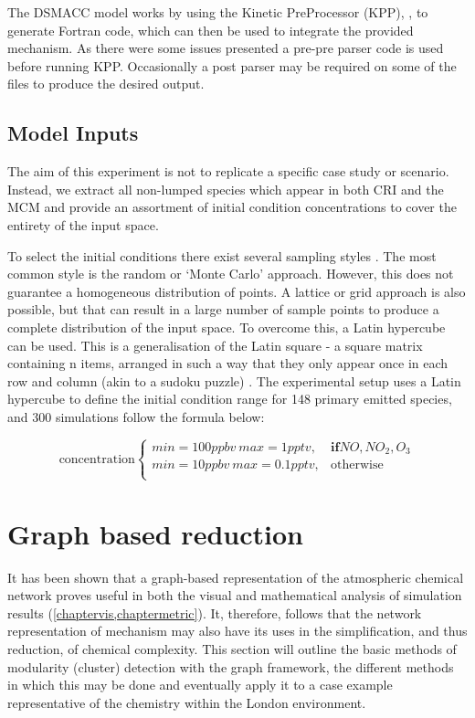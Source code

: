 The DSMACC model works by using the Kinetic PreProcessor (KPP), \citep{kpp}, to generate Fortran code, which can then be used to integrate the provided mechanism. As there were some issues presented a pre-pre parser code is used before running KPP. Occasionally a post parser may be required on some of the files to produce the desired output.

\subsection{Model Inputs}\label{sec:lumpinputs}
The aim of this experiment is not to replicate a specific case study or scenario. Instead, we extract all non-lumped species which appear in both CRI and the MCM and provide an assortment of initial condition concentrations to cover the entirety of the input space.

To select the initial conditions there exist several sampling styles \citep{sampling}. The most common style is the random or `Monte Carlo' approach. However, this does not guarantee a homogeneous distribution of points. A lattice or grid approach is also possible, but that can result in a large number of sample points to produce a complete distribution of the input space. To overcome this, a Latin hypercube can be used. This is a generalisation of the Latin square  -  a square matrix containing n items, arranged in such a way that they only appear once in each row and column (akin to a sudoku puzzle) \citep{lsq}. The experimental setup uses a Latin hypercube to define the initial condition range for 148 primary emitted species, and 300 simulations follow the formula below:

\begin{equation}
\text{concentration}
    \begin{cases}
      min = 100ppbv \ max=1pptv , & \mathbf{if} NO,NO_2,O_3\\
      min = 10ppbv \ max=0.1pptv , & \text{otherwise}\\
    \end{cases}
\label{eqn:icslhs}
  \end{equation}
\section{Graph based reduction}\label{sec:graphreduction}
It has been shown that a graph-based representation of the atmospheric chemical network proves useful in both the visual and mathematical analysis of simulation results (\autoref{chaptervis,chaptermetric}). It, therefore, follows that the network representation of mechanism may also have its uses in the simplification, and thus reduction, of chemical complexity.  This section will outline the basic methods of modularity (cluster) detection with the graph framework, the different methods in which this may be done and eventually apply it to a case example representative of the chemistry within the London environment.





